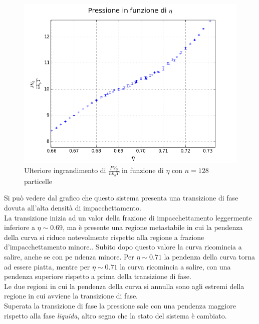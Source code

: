 \begin{figure}[h!]
	\centering
	\includegraphics[scale=0.48]{sfere2D/pressionzoomzoom.png}
	\caption{Ulteriore ingrandimento di  $\frac{P V_0}{n k_{b} T}$ in funzione di $\eta$ con $n=128$ particelle}
	\end{figure}





Si può vedere dal grafico che questo sistema presenta una transizione di fase dovuta all'alta densità di impacchettamento.\\
La transizione inizia ad un valor della frazione di impacchettamento leggermente inferiore a $\eta \sim 0.69$, ma è presente una regione metastabile in cui la pendenza della curva si riduce notevolmente rispetto alla regione a frazione d'impacchettamento minore..
Subito dopo questo valore la curva ricomincia a salire, anche se con pe	ndenza minore.
Per $\eta \sim 0.71$ la pendenza della curva torna ad essere piatta, mentre per $\eta \sim 0.71$ la curva ricomincia a salire, con una pendenza superiore rispetto a prima della transizione di fase.\\
Le due regioni in cui la pendenza della curva si annulla sono agli estremi della regione in cui avviene la transizione di fase.\\
Superata la transizione di fase la pressione sale con una pendenza maggiore rispetto alla fase \emph{liquida}, altro segno che la stato del sistema è cambiato.



